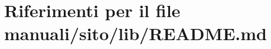 \hypertarget{manuali_2sito_2lib_2README_8md}{}\section{Riferimenti per il file manuali/sito/lib/\+R\+E\+A\+D\+ME.md}
\label{manuali_2sito_2lib_2README_8md}
